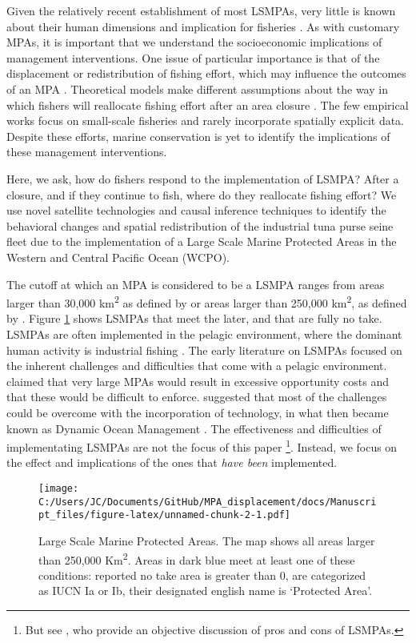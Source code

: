 \documentclass[11pt,]{article}
\let\rmarkdownfootnote\footnote%
\def\footnote{\protect\rmarkdownfootnote}
\begin{document}
Given the relatively recent establishment of most LSMPAs, very little is
known about their human dimensions and implication for fisheries
\citep{gray_2017}. As with customary MPAs, it is important that we
understand the socioeconomic implications of management interventions.
One issue of particular importance is that of the displacement or
redistribution of fishing effort, which may influence the outcomes of an
MPA \citep{smith_2003}. Theoretical models make different assumptions
about the way in which fishers will reallocate fishing effort after an
area closure \citep{}. The few empirical works focus on small-scale
fisheries and rarely incorporate spatially explicit data. Despite these
efforts, marine conservation is yet to identify the implications of
these management interventions.

Here, we ask, how do fishers respond to the implementation of LSMPA?
After a closure, and if they continue to fish, where do they reallocate
fishing effort? We use novel satellite technologies and causal inference
techniques to identify the behavioral changes and spatial redistribution
of the industrial tuna purse seine fleet due to the implementation of a
Large Scale Marine Protected Areas in the Western and Central Pacific
Ocean (WCPO).

The cutoff at which an MPA is considered to be a LSMPA ranges from areas
larger than 30,000 km\textsuperscript{2} as defined by
\citet{desanto_2013} or areas larger than 250,000 km\textsuperscript{2},
as defined by \citep{toonen_2013}. Figure \ref{fig:LSMPAs_map} shows
LSMPAs that meet the later, and that are fully no take. LSMPAs are often
implemented in the pelagic environment, where the dominant human
activity is industrial fishing \citep{gray_2017,kroodsma_2018}. The
early literature on LSMPAs focused on the inherent challenges and
difficulties that come with a pelagic environment. \citet{kaplan_2010}
claimed that very large MPAs would result in excessive opportunity costs
and that these would be difficult to enforce. \citet{game_2009}
suggested that most of the challenges could be overcome with the
incorporation of technology, in what then became known as Dynamic Ocean
Management \citep{maxwell_2015}. The effectiveness and difficulties of
implementating LSMPAs are not the focus of this paper
\footnote{But see \citet{singleton_2014}, who provide an objective discussion of pros and cons of LSMPAs.}.
Instead, we focus on the effect and implications of the ones that
\emph{have been} implemented.

\begin{figure}
\centering
\texttt{[image: C:/Users/JC/Documents/GitHub/MPA\_displacement/docs/Manuscript\_files/figure-latex/unnamed-chunk-2-1.pdf]}
\caption{\label{fig:unnamed-chunk-2}\label{fig:LSMPAs_map}Large Scale Marine
Protected Areas. The map shows all areas larger than 250,000
Km\textsuperscript{2}. Areas in dark blue meet at least one of these
conditions: reported no take area is greater than 0, are categorized as
IUCN Ia or Ib, their designated english name is `Protected Area'.}
\end{figure}
\end{document}
